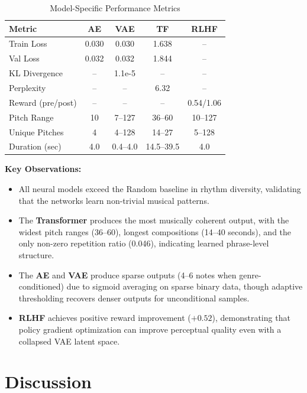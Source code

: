 \documentclass[conference]{IEEEtran}
\begin{document}
\begin{table}[ht]
\centering
\caption{Model-Specific Performance Metrics}
\label{tab:model_metrics}
\begin{tabular}{lcccc}
\toprule
\textbf{Metric} & \textbf{AE} & \textbf{VAE} & \textbf{TF} & \textbf{RLHF} \\
\midrule
Train Loss & 0.030 & 0.030 & 1.638 & -- \\
Val Loss & 0.032 & 0.032 & 1.844 & -- \\
KL Divergence & -- & 1.1e-5 & -- & -- \\
Perplexity & -- & -- & 6.32 & -- \\
Reward (pre/post) & -- & -- & -- & 0.54/1.06 \\
Pitch Range & 10 & 7--127 & 36--60 & 10--127 \\
Unique Pitches & 4 & 4--128 & 14--27 & 5--128 \\
Duration (sec) & 4.0 & 0.4--4.0 & 14.5--39.5 & 4.0 \\
\bottomrule
\end{tabular}
\end{table}

\textbf{Key Observations:}

\begin{itemize}
    \item All neural models exceed the Random baseline in rhythm diversity, validating that the networks learn non-trivial musical patterns.
    \item The \textbf{Transformer} produces the most musically coherent output, with the widest pitch ranges (36--60), longest compositions (14--40 seconds), and the only non-zero repetition ratio (0.046), indicating learned phrase-level structure.
    \item The \textbf{AE} and \textbf{VAE} produce sparse outputs (4--6 notes when genre-conditioned) due to sigmoid averaging on sparse binary data, though adaptive thresholding recovers denser outputs for unconditional samples.
    \item \textbf{RLHF} achieves positive reward improvement ($+0.52$), demonstrating that policy gradient optimization can improve perceptual quality even with a collapsed VAE latent space.
\end{itemize}

\section{Discussion}
\label{sec:discussion}
\end{document}
